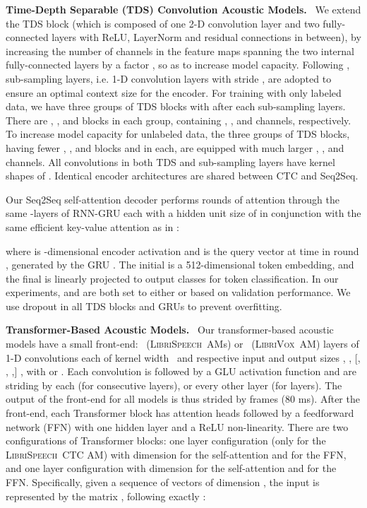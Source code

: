 \documentclass{article}
\newcommand{\librivox}{\textsc{LibriVox}}
\newcommand{\librispeech}{\textsc{LibriSpeech}}
\begin{document}
\textbf{Time-Depth Separable (TDS) Convolution Acoustic Models.}~
\label{sec:TDS}
We extend the TDS block \cite{hannun2019TDS} (which is composed of one 2-D convolution layer and two fully-connected layers with ReLU, LayerNorm and residual connections in between), by increasing the number of channels in the feature maps spanning the two internal fully-connected layers by a factor , so as to increase model capacity. Following \cite{hannun2019TDS},  sub-sampling layers, i.e. 1-D convolution layers with stride , are adopted to ensure an optimal context size for the encoder. 
For training with only labeled data, we have three groups of TDS blocks with  after each sub-sampling layers. There are , , and  blocks in each group, containing , , and  channels, respectively. To increase model capacity for unlabeled data, the three groups of TDS blocks, having fewer , , and  blocks and  in each, are equipped with much larger , , and  channels. 
All convolutions in both TDS and sub-sampling layers have kernel shapes of . Identical encoder architectures are shared between CTC and Seq2Seq. 

Our Seq2Seq self-attention decoder performs  rounds of attention through the same -layers of RNN-GRU each with a hidden unit size of  in conjunction with the same efficient key-value attention as in \cite{hannun2019TDS,vaswani2017attention}: 

where  is -dimensional encoder activation and  is the query vector at time  in round , generated by the GRU . The initial  is a 512-dimensional token embedding, and the final  is linearly projected to output classes for token classification. 
In our experiments,  and  are both set to either  or  based on validation performance. We use dropout in all TDS blocks and GRUs to prevent overfitting.

\textbf{Transformer-Based Acoustic Models.}~
\label{sec:transformers}
Our transformer-based acoustic models have a small front-end: ~(\librispeech~AMs) or ~(\librivox~AM) layers of 1-D convolutions each of kernel width ~and respective input and output sizes , , [, , ,] , with  or . Each convolution is followed by a GLU activation function \cite{dauphin2017gcnn} and are striding by  each (for  consecutive layers), or every other layer (for  layers). The output of the front-end for all models is thus strided by  frames (80 ms). After the front-end, each Transformer block has  attention heads followed by a feedforward network (FFN) with one hidden layer and a ReLU non-linearity. There are two configurations of Transformer blocks: one  layer configuration (only for the \librispeech~CTC AM) with dimension  for the self-attention and  for the FFN, and one  layer configuration with dimension  for the self-attention and  for the FFN. Specifically, given a sequence of  vectors of dimension , the input is represented by the matrix , following exactly \cite{vaswani2017attention}:
\end{document}
